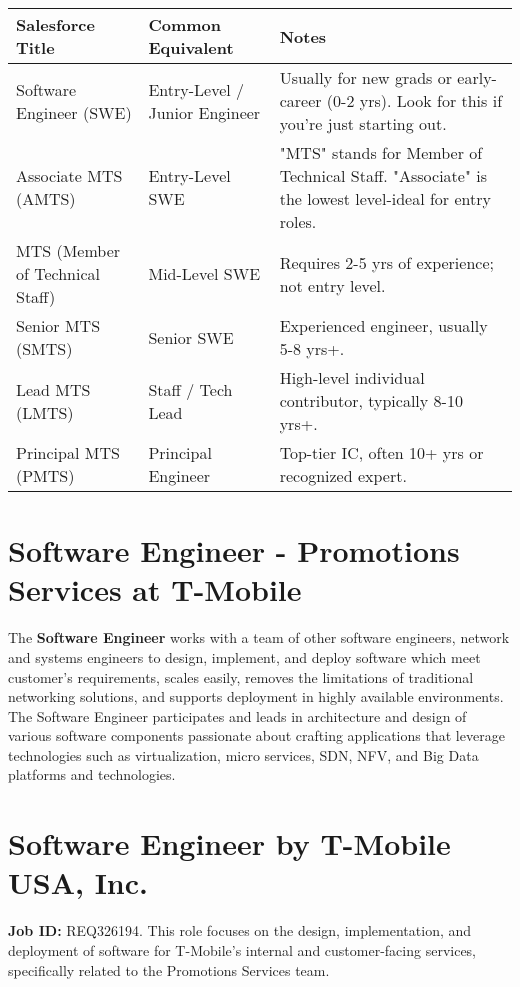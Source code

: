 \documentclass[11pt]{article}
\begin{document}
\begin{tabular}{|l|l|l|}
\hline Salesforce Title & Common Equivalent & Notes \\
\hline Software Engineer (SWE) & Entry-Level / Junior Engineer & Usually for new grads or early-career (0-2 yrs). Look for this if you're just starting out. \\
\hline Associate MTS (AMTS) & Entry-Level SWE & "MTS" stands for Member of Technical Staff. "Associate" is the lowest level-ideal for entry roles. \\
\hline MTS (Member of Technical Staff) & Mid-Level SWE & Requires 2-5 yrs of experience; not entry level. \\
\hline Senior MTS (SMTS) & Senior SWE & Experienced engineer, usually 5-8 yrs+. \\
\hline Lead MTS (LMTS) & Staff / Tech Lead & High-level individual contributor, typically 8-10 yrs+. \\
\hline Principal MTS (PMTS) & Principal Engineer & Top-tier IC, often 10+ yrs or recognized expert. \\
\hline
\end{tabular}


\section*{Software Engineer - Promotions Services at T-Mobile}

The \textbf{Software Engineer} works with a team of other software engineers, 
network and systems engineers to design, implement, and deploy software which 
meet customer's requirements, scales easily, removes the limitations of 
traditional networking solutions, and supports deployment in highly available 
environments. The Software Engineer participates and leads in architecture 
and design of various software components passionate about crafting 
applications that leverage technologies such as virtualization, micro 
services, SDN, NFV, and Big Data platforms and technologies.

\section*{Software Engineer by \textbf{T-Mobile USA, Inc.}}
\textbf{Job ID:} REQ326194. This role focuses on the design, implementation, 
and deployment of software for T-Mobile's internal and customer-facing 
services, specifically related to the Promotions Services team.
\end{document}
